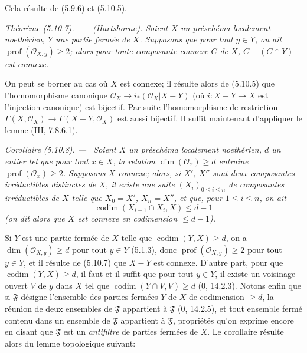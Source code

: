 \documentclass[10pt,oneside]{book}
\newenvironment{theorem}[1][]{%
  \par\medskip\noindent\itshape Théorème (#1). ---\ }{\par}
\newenvironment{corollary}[1][]{%
  \par\medskip\noindent\itshape Corollaire (#1). ---\ }{\par}
\begin{document}
Cela résulte de (5.9.6) et (5.10.5).

\begin{theorem}[5.10.7]
\label{IV.2.s5.10.7-fr}
\emph{(Hartshorne).} Soient $X$ un préschéma localement noethérien, $Y$ une
partie fermée de $X$. Supposons que pour tout $y\in Y$, on ait
$\operatorname{prof}(\mathcal O_{X,y})\geq2$; alors pour toute composante
connexe $C$ de $X$, $C-(C\cap Y)$ est connexe.
\end{theorem}

On peut se borner au cas où $X$ est connexe; il résulte alors de (5.10.5) que
l'homomorphisme canonique
$\mathcal O_X\to i_*(\mathcal O_X|X-Y)$ (où $i:X-Y\to X$ est l'injection
canonique) est bijectif. Par suite l'homomorphisme de restriction
$\Gamma(X,\mathcal O_X)\to\Gamma(X-Y,\mathcal O_X)$ est aussi bijectif. Il
suffit maintenant d'appliquer le lemme (III, 7.8.6.1).

\begin{corollary}[5.10.8]
\label{IV.2.s5.10.8-fr}
Soient $X$ un préschéma localement noethérien, $d$ un entier tel que pour tout
$x\in X$, la relation $\dim(\mathcal O_x)\geq d$ entraîne
$\operatorname{prof}(\mathcal O_x)\geq2$. Supposons $X$ connexe; alors, si
$X'$, $X''$ sont deux composantes irréductibles distinctes de $X$, il existe
une suite $(X_i)_{0\leq i\leq n}$ de composantes irréductibles de $X$ telle
que $X_0=X'$, $X_n=X''$, et que, pour $1\leq i\leq n$, on ait
\[
\operatorname{codim}(X_{i-1}\cap X_i,X)\leq d-1
\]
(on dit alors que $X$ est connexe en codimension $\leq d-1$).
\end{corollary}

Si $Y$ est une partie fermée de $X$ telle que
$\operatorname{codim}(Y,X)\geq d$, on a $\dim(\mathcal O_{X,y})\geq d$ pour
tout $y\in Y$ (5.1.3), donc $\operatorname{prof}(\mathcal O_{X,y})\geq2$ pour
tout $y\in Y$, et il résulte de (5.10.7) que $X-Y$ est connexe. D'autre part,
pour que $\operatorname{codim}(Y,X)\geq d$, il faut et il suffit que pour tout
$y\in Y$, il existe un voisinage ouvert $V$ de $y$ dans $X$ tel que
$\operatorname{codim}(Y\cap V,V)\geq d$ (0, 14.2.3). Notons enfin que si
$\mathfrak F$ désigne l'ensemble des parties fermées $Y$ de $X$ de
codimension $\geq d$, la réunion de deux ensembles de $\mathfrak F$ appartient
à $\mathfrak F$ (0, 14.2.5), et tout ensemble fermé contenu dans un ensemble
de $\mathfrak F$ appartient à $\mathfrak F$, propriétés qu'on exprime encore
en disant que $\mathfrak F$ est un \emph{antifiltre} de parties fermées de
$X$. Le corollaire résulte alors du lemme topologique suivant:
\end{document}
